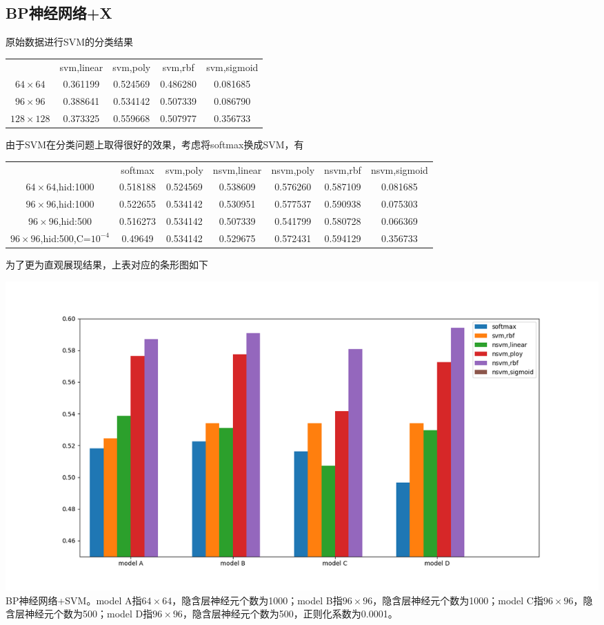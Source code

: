 \subsection{BP神经网络+X}
原始数据进行SVM的分类结果
\begin{center}
\begin{tabular}{ccccc}
\toprule[2pt]
\ & svm,linear & svm,poly & svm,rbf & svm,sigmoid \\ 
$64\times64$ & 0.361199 & 0.524569 & 0.486280 & 0.081685 \\ 
$96\times96$ & 0.388641 & 0.534142 & 0.507339 & 0.086790 \\ 
$128\times128$ & 0.373325 & 0.559668 & 0.507977 & 0.356733 \\ 
\bottomrule[2pt]
\end{tabular}
\end{center} 

由于SVM在分类问题上取得很好的效果，考虑将softmax换成SVM，有
\begin{center}
\begin{tabular}{ccccccc}
\toprule[2pt]
\ &softmax &svm,poly &nsvm,linear & nsvm,poly & nsvm,rbf & nsvm,sigmoid \\ 
$64\times64$,hid:1000 & 0.518188 & 0.524569 & 0.538609 & 0.576260 & 0.587109 & 0.081685 \\ 
$96\times96$,hid:1000 & 0.522655 & 0.534142 & 0.530951 & 0.577537 & 0.590938 & 0.075303 \\ 
$96\times96$,hid:500 & 0.516273 & 0.534142 & 0.507339 & 0.541799 & 0.580728 & 0.066369 \\ 
$96\times96$,hid:500,C=$10^{-4}$ & 0.49649 & 0.534142 & 0.529675 & 0.572431 & 0.594129 & 0.356733 \\ 
\bottomrule[2pt]
\end{tabular} 
\end{center}

为了更为直观展现结果，上表对应的条形图如下
\begin{center}
\includegraphics[scale=0.5]{../figures/NN_svm1.png} \\
BP神经网络+SVM。model A指$64\times64$，隐含层神经元个数为1000；model B指$96\times96$，隐含层神经元个数为1000；model C指$96\times96$，隐含层神经元个数为500；model D指$96\times96$，隐含层神经元个数为500，正则化系数为0.0001。
\end{center}

